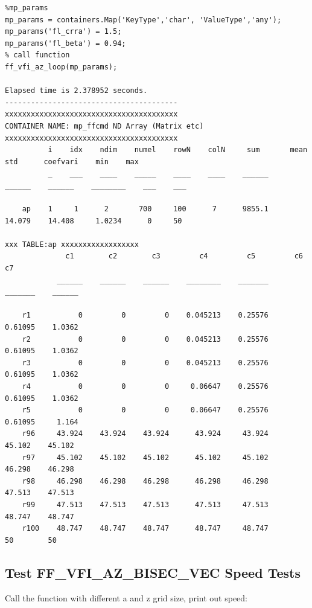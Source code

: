 \documentclass[
]{book}
\begin{document}
\begin{verbatim}
%mp_params
mp_params = containers.Map('KeyType','char', 'ValueType','any');
mp_params('fl_crra') = 1.5;
mp_params('fl_beta') = 0.94;
% call function
ff_vfi_az_loop(mp_params);

Elapsed time is 2.378952 seconds.
----------------------------------------
xxxxxxxxxxxxxxxxxxxxxxxxxxxxxxxxxxxxxxxx
CONTAINER NAME: mp_ffcmd ND Array (Matrix etc)
xxxxxxxxxxxxxxxxxxxxxxxxxxxxxxxxxxxxxxxx
          i    idx    ndim    numel    rowN    colN     sum       mean      std      coefvari    min    max
          _    ___    ____    _____    ____    ____    ______    ______    ______    ________    ___    ___

    ap    1     1      2       700     100      7      9855.1    14.079    14.408     1.0234      0     50 

xxx TABLE:ap xxxxxxxxxxxxxxxxxx
              c1        c2        c3         c4         c5         c6         c7  
            ______    ______    ______    ________    _______    _______    ______

    r1           0         0         0    0.045213    0.25576    0.61095    1.0362
    r2           0         0         0    0.045213    0.25576    0.61095    1.0362
    r3           0         0         0    0.045213    0.25576    0.61095    1.0362
    r4           0         0         0     0.06647    0.25576    0.61095    1.0362
    r5           0         0         0     0.06647    0.25576    0.61095     1.164
    r96     43.924    43.924    43.924      43.924     43.924     45.102    45.102
    r97     45.102    45.102    45.102      45.102     45.102     46.298    46.298
    r98     46.298    46.298    46.298      46.298     46.298     47.513    47.513
    r99     47.513    47.513    47.513      47.513     47.513     48.747    48.747
    r100    48.747    48.747    48.747      48.747     48.747         50        50
\end{verbatim}

\hypertarget{test-ff_vfi_az_bisec_vec-speed-tests}{%
\subsection{Test FF\_VFI\_AZ\_BISEC\_VEC Speed Tests}\label{test-ff_vfi_az_bisec_vec-speed-tests}}

Call the function with different a and z grid size, print out speed:
\end{document}
